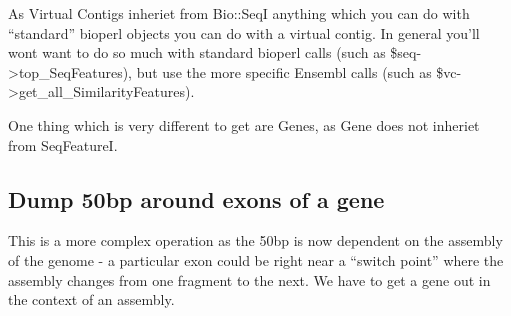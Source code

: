 \documentclass[11pt,a4paper]{article}
\begin{document}
As Virtual Contigs inheriet from Bio::SeqI anything which you can do
with ``standard'' bioperl objects you can do with a virtual contig. In
general you'll wont want to do so much with standard bioperl calls
(such as \$seq->top\_SeqFeatures), but use the more specific Ensembl
calls (such as \$vc->get\_all\_SimilarityFeatures).

One thing which is very different to get are Genes, as Gene does
not inheriet from SeqFeatureI.


\subsection{Dump 50bp around exons of a gene}

This is a more complex operation as the 50bp is now dependent on the
assembly of the genome - a particular exon could be right near a
``switch point'' where the assembly changes from one fragment to the
next. We have to get a gene out in the context of an assembly.
\end{document}
